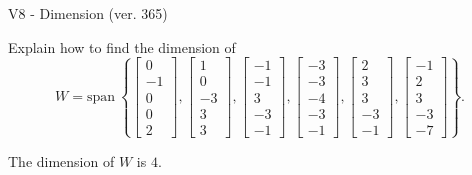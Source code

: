 \begin{exercise}
  \begin{exerciseTitle}V8 - Dimension (ver. 365)\end{exerciseTitle}
  \begin{exerciseStatement}
    Explain how to find the dimension of 
\[W=\mathrm{span}\ \left\{\left[\begin{array}{r}
0 \\
-1 \\
0 \\
0 \\
2
\end{array}\right] , \left[\begin{array}{r}
1 \\
0 \\
-3 \\
3 \\
3
\end{array}\right] , \left[\begin{array}{r}
-1 \\
-1 \\
3 \\
-3 \\
-1
\end{array}\right] , \left[\begin{array}{r}
-3 \\
-3 \\
-4 \\
-3 \\
-1
\end{array}\right] , \left[\begin{array}{r}
2 \\
3 \\
3 \\
-3 \\
-1
\end{array}\right] , \left[\begin{array}{r}
-1 \\
2 \\
3 \\
-3 \\
-7
\end{array}\right]\right\}.\]



  \end{exerciseStatement}
  \begin{exerciseAnswer}
   The dimension of \(W\) is  \(4\).
  


  \end{exerciseAnswer}
\end{exercise}